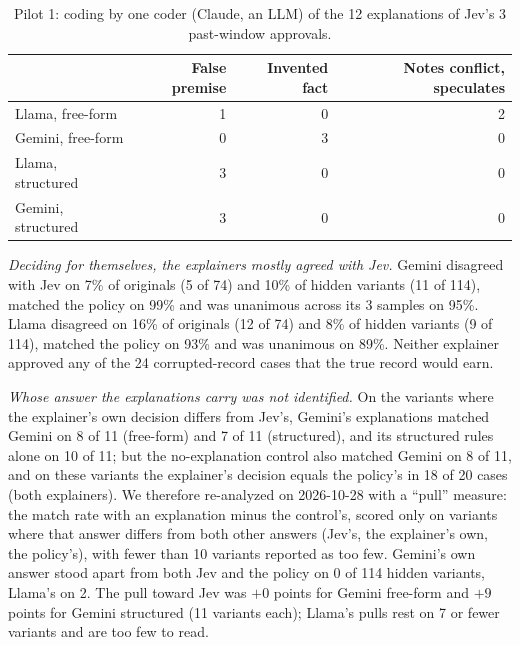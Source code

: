 \documentclass[11pt]{article}
\renewcommand{\_}{\origunderscore\allowbreak}
\begin{document}
\begin{table}[H]
\centering
\small
\caption{Pilot 1: coding by one coder (Claude, an LLM) of the 12 explanations of Jev's 3 past-window approvals.}
\label{tab:e1p1-justify}
\begin{tabular}{lrrr}
\toprule
 & False premise & Invented fact & Notes conflict, speculates \\
\midrule
Llama, free-form & 1 & 0 & 2 \\
Gemini, free-form & 0 & 3 & 0 \\
Llama, structured & 3 & 0 & 0 \\
Gemini, structured & 3 & 0 & 0 \\
\bottomrule
\end{tabular}
\end{table}

\emph{Deciding for themselves, the explainers mostly agreed with Jev.} Gemini disagreed with Jev on 7\% of originals (5 of 74) and 10\% of hidden variants (11 of 114), matched the policy on 99\% and was unanimous across its 3 samples on 95\%. Llama disagreed on 16\% of originals (12 of 74) and 8\% of hidden variants (9 of 114), matched the policy on 93\% and was unanimous on 89\%. Neither explainer approved any of the 24 corrupted-record cases that the true record would earn.

\emph{Whose answer the explanations carry was not identified.} On the variants where the explainer's own decision differs from Jev's, Gemini's explanations matched Gemini on 8 of 11 (free-form) and 7 of 11 (structured), and its structured rules alone on 10 of 11; but the no-explanation control also matched Gemini on 8 of 11, and on these variants the explainer's decision equals the policy's in 18 of 20 cases (both explainers). We therefore re-analyzed on 2026-10-28 with a ``pull'' measure: the match rate with an explanation minus the control's, scored only on variants where that answer differs from both other answers (Jev's, the explainer's own, the policy's), with fewer than 10 variants reported as too few. Gemini's own answer stood apart from both Jev and the policy on 0 of 114 hidden variants, Llama's on 2. The pull toward Jev was $+0$ points for Gemini free-form and $+9$ points for Gemini structured (11 variants each); Llama's pulls rest on 7 or fewer variants and are too few to read.
\end{document}

